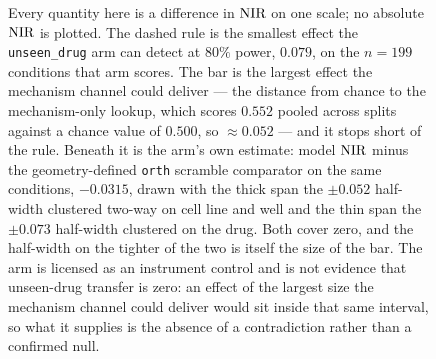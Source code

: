 \begin{figure}[htbp]
\begin{fullwidth}
\caption[The detection floor sits above the largest plausible
effect]{ Every quantity
here is a difference in $\textrm{NIR}$ on one scale; no absolute $\textrm{NIR}$ is plotted.
The dashed rule is the smallest effect the \texttt{unseen\_drug} arm can
detect at $80\%$ power, $0.079$, on the $n = \num{199}$ conditions that arm
scores. The bar is the largest effect the mechanism channel could deliver ---
the distance from chance to the mechanism-only lookup, which scores $0.552$
pooled across splits against a chance value of $0.500$, so $\approx 0.052$ ---
and it stops short of the rule. Beneath it is the arm's own estimate: model
$\textrm{NIR}$ minus the geometry-defined \texttt{orth} scramble comparator on the
same conditions, $-0.0315$, drawn with the thick span the $\pm 0.052$
half-width clustered two-way on cell line and well and the thin span the
$\pm 0.073$ half-width clustered on the drug. Both cover zero, and the
half-width on the tighter of the two is itself the size of the bar. The arm
is licensed as an instrument control and is not evidence that unseen-drug
transfer is zero: an effect of the largest size the mechanism channel could
deliver would sit inside that same interval, so what it supplies is the
absence of a contradiction rather than a confirmed null.}
\label{fig:power}
\end{fullwidth}
\end{figure}
